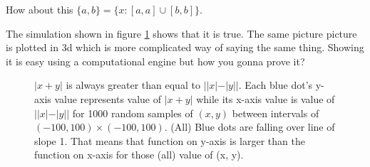 \documentclass[answers,addpoints]{exam}
\begin{document}
\begin{questions}
\begin{parts}
    \begin{solution}

        How about this  $ \{a, b \} = \{ x : [a, a] \cup [b,b] \}$. 
    \end{solution}

\end{parts}


\begin{solution} 

    The simulation shown in figure \ref{fig:2a} shows that it is true. The same
    picture  picture is plotted in 3d which is more complicated way of saying the
    same thing. Showing it is easy using a computational engine but how you gonna
    prove it?

     \mydata

    \begin{figure}[H]
        \centering
        \caption{ $|x+y|$ is always greater than equal to $||x|-|y||$. Each blue
            dot's y-axis value represents value of $|x+y|$ while its x-axis value is value of
            $||x|-|y||$ for 1000 random samples of $(x,y)$ between intervals of
            $(-100, 100)\times(-100,100)$. (All) Blue dots are  falling over line of slope 1.
            That means that function on  y-axis is
            larger than the function on x-axis  for those (all) value of (x, y).
        }
        \label{fig:2a}
    \end{figure}
\end{solution}


\end{questions}
\end{document}
